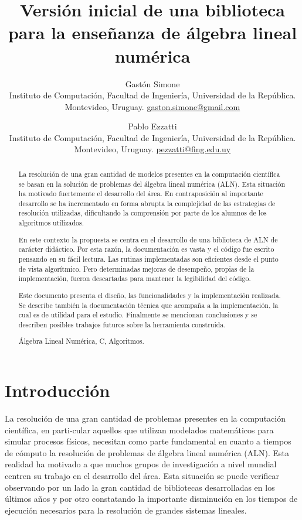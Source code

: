 \documentclass{cacic06}
\title{Versión inicial de una biblioteca para la enseñanza de álgebra lineal numérica}
\author{Gastón Simone \\
Instituto de Computación, Facultad de Ingeniería, Universidad de la República. 
\\ Montevideo, Uruguay.  \url{gaston.simone@gmail.com} 
\and 
Pablo Ezzatti \\  
Instituto de Computación, Facultad de Ingeniería, Universidad de la República.
 \\ Montevideo, Uruguay.  \url{pezzatti@fing.edu.uy}}
\begin{document}
\maketitle
\thispagestyle{empty}

\begin{abstract}
La resolución de una gran cantidad de modelos presentes en la computación científica se basan en la solución de problemas del álgebra lineal numérica (ALN). 
Esta situación ha motivado fuertemente el desarrollo del área.
En contraposición al importante desarrollo se ha incrementado en forma abrupta la complejidad de las estrategias de resolución utilizadas, dificultando la comprensión por parte de los alumnos de los algoritmos utilizados.

En este contexto la propuesta se centra en el desarrollo de una biblioteca de ALN de carácter didáctico. 
Por esta razón, la documentación es vasta y el código fue escrito pensando en su fácil lectura. Las rutinas implementadas son eficientes desde el punto de vista algorítmico. 
Pero determinadas mejoras de desempeño, propias de la implementación, fueron descartadas para mantener la legibilidad del código.

Este documento presenta el diseño, las funcionalidades y la implementación realizada.
Se describe también la documentación técnica que acompaña a la implementación, la cual es de utilidad para el estudio. 
Finalmente se mencionan conclusiones y se describen posibles trabajos futuros sobre la herramienta construida.
\begin{keywords}
Álgebra Lineal Numérica, C, Algoritmos.
\end{keywords}

\end{abstract}

\newpage


\section{Introducción}

La resolución de una  gran cantidad de problemas presentes en la computación científica, en parti-cular aquellos que utilizan modelados matemáticos para simular procesos físicos, necesitan como parte fundamental en cuanto a tiempos de cómputo la resolución de problemas de álgebra lineal numérica (ALN).
Esta realidad ha motivado a que muchos grupos de investigación a nivel mundial centren su trabajo en el desarrollo del área. 
Esta situación se puede verificar observando por un lado la gran cantidad de bibliotecas desarrolladas en los últimos años y por otro constatando la importante disminución en los tiempos de ejecución necesarios para la resolución de grandes sistemas lineales.
 
\end{document}
